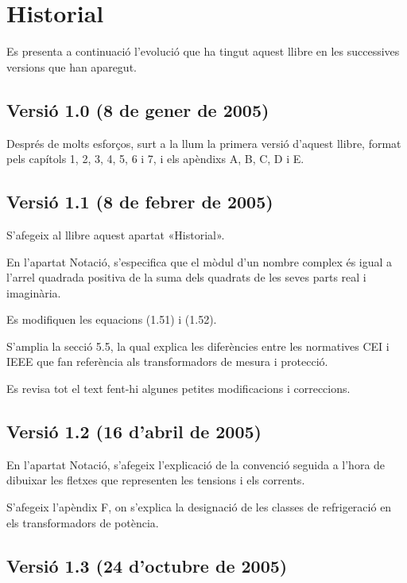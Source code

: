 \chapter*{Historial}

Es presenta a continuació l'evolució que ha tingut aquest llibre en
les successives versions que han aparegut.

\section*{Versió 1.0 (8 de gener de 2005)}

Després de molts esforços, surt a la llum la primera versió d'aquest
llibre, format pels capítols 1, 2, 3, 4, 5, 6 i 7, i els apèndixs A,
B, C, D i E.

\section*{Versió 1.1 (8 de febrer de 2005)}

S'afegeix al llibre aquest apartat «Historial».

En l'apartat Notació, s'especifica que el mòdul d'un nombre
complex és igual a l'arrel quadrada positiva de la suma dels
quadrats de les seves parts real i imaginària.

Es modifiquen les equacions (1.51) i (1.52).

S'amplia la secció 5.5, la qual explica les diferències entre les
normatives CEI i IEEE que fan referència als
transformadors de mesura i protecció.

Es revisa tot el text fent-hi algunes petites modificacions i
correccions.

\section*{Versió 1.2 (16 d'abril de 2005)}

En l'apartat Notació, s'afegeix l'explicació de la convenció
seguida a l'hora de dibuixar les fletxes que representen les
tensions i els corrents.

S'afegeix l'apèndix F, on s'explica la designació de les classes de
refrigeració en els transformadors de potència.

\section*{Versió 1.3 (24 d'octubre de 2005)}

